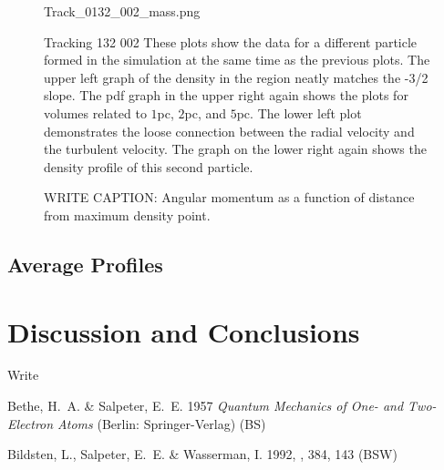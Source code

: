\documentclass{emulateapj}
\begin{document}
\begin{figure}
 {Track_0132_002_mass.png}
\caption{Tracking 132 002  These plots show the data for a different particle formed in the simulation at the same time as the previous plots.  The upper left graph of the density in the region neatly matches the -3/2 slope.  The pdf graph in the upper right again shows the plots for volumes related to $1$pc, $2$pc, and $5$pc.  The lower left plot demonstrates the loose connection between the radial velocity and the turbulent velocity.  The graph on the lower right again shows the density profile of this second particle.     \label{fig:132_002_graphs}}
\end{figure}





\begin{figure}
\caption{WRITE CAPTION: Angular momentum as a function of distance from maximum density point.     \label{fig:angular_momentum_example}}
\end{figure}



\subsection{Average Profiles}

\section{Discussion and Conclusions}

\acknowledgments

Write

\begin{references}

\noindent
Bethe, H.~A. \& Salpeter, E.~E. 1957 \textit{Quantum Mechanics of One-
  and Two-Electron Atoms} (Berlin: Springer-Verlag) (BS) 

\noindent
Bildsten, L., Salpeter, E.~E. \& Wasserman, I. 1992, \apj, 384, 143
(BSW) 


\end{references}
\end{document}
